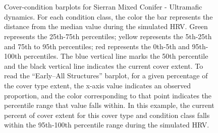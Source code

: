 \begin{figure}[!htbp]
  \\%
  \\%
    \\%
    \\%
    \\%
    \\%
    \\%
  \caption{Cover-condition barplots for Sierran Mixed Conifer - Ultramafic dynamics. For each condition class, the color the bar represents the distance from the median value during the simulated HRV. Green represents the 25th-75th percentiles; yellow represents the 5th-25th and 75th to 95th percentiles; red represents the 0th-5th and 95th-100th percentiles. The blue vertical line marks the 50th percentile and the black vertical line indicates the current cover extent. To read the ``Early–All Structures'' barplot, for a given percentage of the cover type extent, the x-axis value indicates an observed proportion, and the color corresponding to that point indicates the percentile range that value falls within. In this example, the current percent of cover extent for this cover type and condition class falls within the 95th-100th percentile range during the simulated HRV.}
  \label{fig:covcondbar_smcu}
\end{figure}

